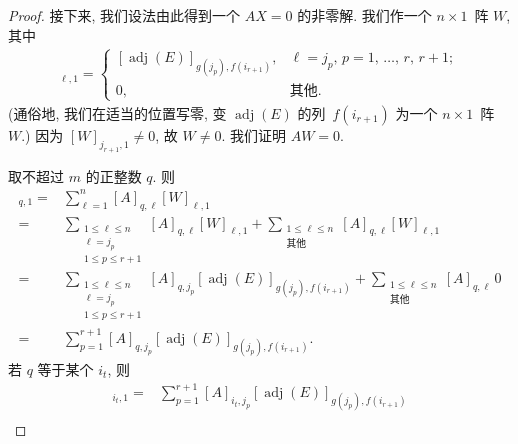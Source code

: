 \begin{proof}
    接下来, 我们设法由此得到一个 \(AX = 0\)
    的非零解.
    我们作一个 \(n \times 1\)~阵 \(W\), 其中
    \begin{align*}
        [W]_{\ell,1}
        = \begin{cases}
              [\operatorname{adj} {(E)}]_{g(j_p),f(i_{r+1})},
                 & \text{\(\ell = j_p\),
              \(p = 1\), \(\dots\), \(r\), \(r+1\)}; \\
              0, & \text{其他}.
          \end{cases}
    \end{align*}
    (通俗地, 我们在适当的位置写零,
    变 \(\operatorname{adj} {(E)}\)
    的列~\(f(i_{r+1})\)
    为一个 \(n \times 1\)~阵 \(W\).)
    因为 \([W]_{j_{r+1},1} \neq 0\),
    故 \(W \neq 0\).
    我们证明 \(AW = 0\).

    取不超过 \(m\) 的正整数 \(q\).
    则
    \begin{align*}
        [AW]_{q,1}
        = {} &
        \sum_{\ell = 1}^{n}
        {[A]_{q,\ell} [W]_{\ell,1}}
        \\
        = {} &
        \sum_{\substack{
        1 \leq \ell \leq n \\
        \ell = j_p         \\
                1 \leq p \leq r+1
            }}
        {[A]_{q,\ell} [W]_{\ell,1}}
        +
        \sum_{\substack{
        1 \leq \ell \leq n \\
                \text{其他}
            }}
        {[A]_{q,\ell} [W]_{\ell,1}}
        \\
        = {} &
        \sum_{\substack{
        1 \leq \ell \leq n \\
        \ell = j_p         \\
                1 \leq p \leq r+1
            }}
        {[A]_{q,j_p}
                [\operatorname{adj} {(E)}]_{g(j_p),f(i_{r+1})}}
        +
        \sum_{\substack{
        1 \leq \ell \leq n \\
                \text{其他}
            }}
        {[A]_{q,\ell}\, 0}
        \\
        = {} &
        \sum_{p=1}^{r+1}
        {[A]_{q,j_p}
            [\operatorname{adj} {(E)}]_{g(j_p),f(i_{r+1})}}.
    \end{align*}
    若 \(q\) 等于某个 \(i_t\), 则
    \begin{align*}
        [AW]_{i_t,1}
        = {} &
        \sum_{p=1}^{r+1}
        {[A]_{i_t,j_p}
            [\operatorname{adj} {(E)}]_{g(j_p),f(i_{r+1})}}
        \\

\end{align*}
\end{proof}
